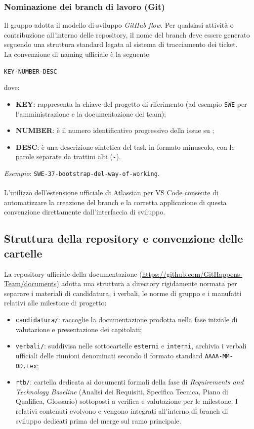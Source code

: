 \subsubsection{Nominazione dei branch di lavoro (Git)}
Il gruppo adotta il modello di sviluppo \emph{GitHub flow}. Per qualsiasi attività o contribuzione all'interno delle repository, il nome del branch deve essere generato seguendo una struttura standard legata al sistema di tracciamento dei ticket. \\
La convenzione di naming ufficiale è la seguente:
\begin{center}
    \texttt{KEY-NUMBER-DESC}
\end{center}
dove:
\begin{itemize}
    \item \textbf{KEY}: rappresenta la chiave del progetto  di riferimento (ad esempio \texttt{SWE} per l'amministrazione e la documentazione del team);
    \item \textbf{NUMBER}: è il numero identificativo progressivo della issue su ;
    \item \textbf{DESC}: è una descrizione sintetica del task in formato minuscolo, con le parole separate da trattini alti (\texttt{-}).
\end{itemize}
\emph{Esempio}: \texttt{SWE-37-bootstrap-del-way-of-working}. \\
\\
L'utilizzo dell'estensione ufficiale di Atlassian per VS Code consente di automatizzare la creazione del branch e la corretta applicazione di questa convenzione direttamente dall'interfaccia di sviluppo.

\subsection{Struttura della repository e convenzione delle cartelle}
La repository ufficiale della documentazione (\url{https://github.com/GitHappens-Team/documents}) adotta una struttura a directory rigidamente normata per separare i materiali di candidatura, i verbali, le norme di gruppo e i manufatti relativi alle milestone di progetto:
\begin{itemize}
    \item \texttt{candidatura/}: raccoglie la documentazione prodotta nella fase iniziale di valutazione e presentazione dei capitolati;
    \item \texttt{verbali/}: suddivisa nelle sottocartelle \texttt{esterni} e \texttt{interni}, archivia i verbali ufficiali delle riunioni denominati secondo il formato standard \texttt{AAAA-MM-DD.tex};
    \item \texttt{rtb/}: cartella dedicata ai documenti formali della fase di \emph{Requirements and Technology Baseline} (Analisi dei Requisiti, Specifica Tecnica, Piano di Qualifica, Glossario) sottoposti a verifica e valutazione per le milestone. I relativi contenuti evolvono e vengono integrati all'interno di branch di sviluppo dedicati prima del merge sul ramo principale.
\end{itemize}

